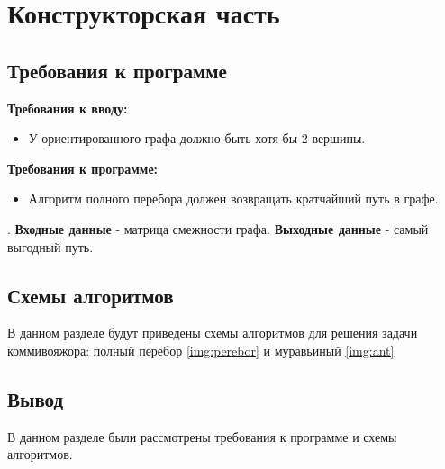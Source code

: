 \chapter{Конструкторская часть}

\section{Требования к программе}
\textbf{Требования к вводу:}
\begin{itemize}
	\item У ориентированного графа должно быть хотя бы 2 вершины.
\end{itemize}

\textbf{Требования к программе:}
\begin{itemize}
	\item Алгоритм полного перебора должен возвращать кратчайший путь в графе.
\end{itemize}
.  
\newline  
\textbf{Входные данные} - матрица смежности графа.  
\newline
\textbf{Выходные данные} - самый выгодный путь.

\section{Схемы алгоритмов}
В данном разделе будут приведены схемы алгоритмов для решения задачи коммивояжора:
полный перебор \ref{img:perebor} и муравьиный \ref{img:ant}\\

\newpage
{}

\newpage
{}

\newpage

\section*{Вывод}
В данном разделе были рассмотрены требования к программе и схемы алгоритмов.
